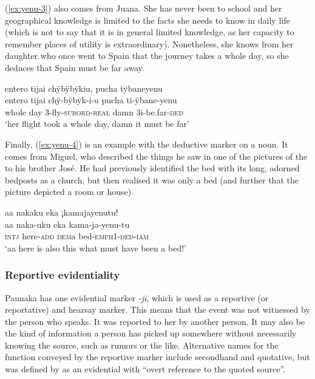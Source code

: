 (\ref{ex:yenu-3}) also comes from Juana. She has never been to school and her geographical knowledge is limited to the facts she needs to know in daily life (which is not to say that it is in general limited knowledge, as her capacity to remember places of utility is extraordinary). Nonetheless, she knows from her daughter who once went to Spain that the journey takes a whole day, so she deduces that Spain must be far away.

\ea\label{ex:yenu-3}
\begingl
\glpreamble entero tijai chÿbÿbÿkiu, pucha tÿbaneyenu\\
\gla entero tijai chÿ-bÿbÿk-i-u pucha ti-ÿbane-yenu\\
\glb whole day 3-fly-\textsc{subord}-\textsc{real} damn 3i-be.far-\textsc{ded}\\
\glft ‘her flight took a whole day, damn it must be far’
\endgl
\trailingcitation{[jxx-p120430l-1.247-248]}
\xe

Finally, (\ref{ex:yenu-4}) is an example with the deductive marker on a noun. It comes from Miguel, who described the things he saw in one of the pictures of the  to his brother José. He had previously identified the bed with its long, adorned bedposts as a church, but then realised it was only a bed (and further that the picture depicted a room or house).

\ea\label{ex:yenu-4}
\begingl
\glpreamble aa nakaku eka ¡kamajayenutu!\\
\gla aa naka-uku eka kama-ja-yenu-tu\\
\glb \textsc{intj} here-\textsc{add} \textsc{dem}a bed-\textsc{emph}1-\textsc{ded}-\textsc{iam}\\
\glft ‘aa here is also this what must have been a bed!’
\endgl
\trailingcitation{[mox-a110920l-2.032]}
\xe

\subsubsection{Reportive evidentiality}\label{sec:Evidentiality}

Paunaka has one evidential marker \textit{-ji}, which is used as a reportive (or reportative) and hearsay marker. This means that the event was not witnessed by the person who speaks. It was reported to her by another person. It may also be the kind of information a person has picked up somewhere without necessarily knowing the source, such as rumors or the like. Alternative names for the function conveyed by the reportive marker include secondhand \citep[210]{Mueller2013} and quotative, but  was defined by \citet[64]{Aikhenvald2004} as an evidential with “overt reference to the quoted source”.

